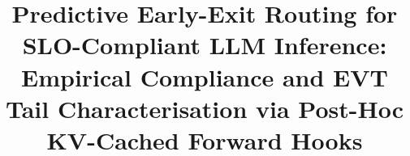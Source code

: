 \documentclass[conference]{IEEEtran}
\begin{document}
\title{Predictive Early-Exit Routing for SLO-Compliant LLM Inference:\\
Empirical Compliance and EVT Tail Characterisation via Post-Hoc KV-Cached Forward Hooks}

\author{
}

\maketitle

\end{document}
